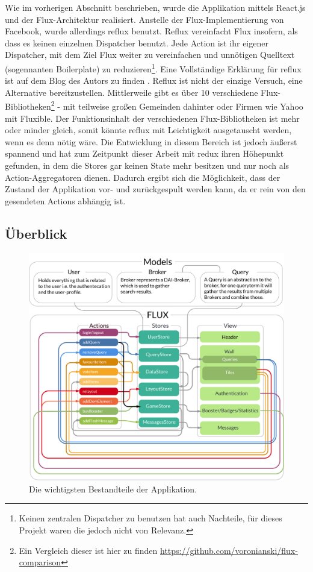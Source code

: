 \documentclass[12pt,twoside]{book}
\begin{document}
Wie im vorherigen Abschnitt beschrieben, wurde die Applikation mittels React.js und der Flux-Architektur realisiert. Anstelle der Flux-Implementierung von Facebook, wurde allerdings reflux benutzt. Reflux vereinfacht Flux insofern, als dass es keinen einzelnen Dispatcher benutzt. Jede Action ist ihr eigener Dispatcher, mit dem Ziel Flux weiter zu vereinfachen und unnötigen Quelltext (sogennanten Boilerplate) zu reduzieren\footnote{Keinen zentralen Dispatcher zu benutzen hat auch Nachteile, für dieses Projekt waren die jedoch nicht von Relevanz.}. Eine Vollständige Erklärung für reflux ist auf dem Blog des Autors zu finden \cite{reflux}. Reflux ist nicht der einzige Versuch, eine Alternative bereitzustellen. Mittlerweile gibt es über 10 verschiedene Flux-Bibliotheken\footnote{Ein Vergleich dieser ist hier zu finden \url{https://github.com/voronianski/flux-comparison}} - mit teilweise großen Gemeinden dahinter oder Firmen wie Yahoo mit Fluxible. Der Funktionsinhalt der verschiedenen Flux-Bibliotheken ist mehr oder minder gleich, somit könnte reflux mit Leichtigkeit ausgetauscht werden, wenn es denn nötig wäre.
Die Entwicklung in diesem Bereich ist jedoch äußerst spannend und hat zum Zeitpunkt dieser Arbeit mit redux \cite{gitredux} ihren Höhepunkt gefunden, in dem die Stores gar keinen State mehr besitzen und nur noch als Action-Aggregatoren dienen. Dadurch ergibt sich die Möglichkeit, dass der Zustand der Applikation vor- und zurückgespult werden kann, da er rein von den gesendeten Actions abhängig ist\citep{redux}.


\subsection{Überblick}

\begin{figure}[htbp]
    \centering
    \includegraphics[width=1.0\textwidth]{images/architecture.pdf}
    \caption{Die wichtigsten Bestandteile der Applikation.}
    \label{fig:architecture}
\end{figure}
\end{document}
